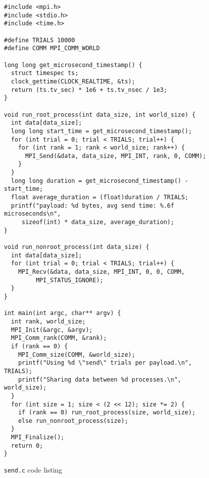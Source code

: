 \begin{figure}
\begin{Verbatim}[frame=single]
#include <mpi.h>
#include <stdio.h>
#include <time.h>

#define TRIALS 10000
#define COMM MPI_COMM_WORLD

long long get_microsecond_timestamp() {
  struct timespec ts;
  clock_gettime(CLOCK_REALTIME, &ts);
  return (ts.tv_sec) * 1e6 + ts.tv_nsec / 1e3;
}

void run_root_process(int data_size, int world_size) {
  int data[data_size];
  long long start_time = get_microsecond_timestamp();
  for (int trial = 0; trial < TRIALS; trial++) {
    for (int rank = 1; rank < world_size; rank++) {
      MPI_Send(&data, data_size, MPI_INT, rank, 0, COMM);
    }
  }
  long long duration = get_microsecond_timestamp() - start_time;
  float average_duration = (float)duration / TRIALS;
  printf("payload: %d bytes, avg send time: %.6f microseconds\n",
	 sizeof(int) * data_size, average_duration);
}

void run_nonroot_process(int data_size) {
  int data[data_size];
  for (int trial = 0; trial < TRIALS; trial++) {
    MPI_Recv(&data, data_size, MPI_INT, 0, 0, COMM,
	     MPI_STATUS_IGNORE);
  }
}

int main(int argc, char** argv) {
  int rank, world_size;
  MPI_Init(&argc, &argv);
  MPI_Comm_rank(COMM, &rank);
  if (rank == 0) {
    MPI_Comm_size(COMM, &world_size);
    printf("Using %d \"send\" trials per payload.\n", TRIALS);
    printf("Sharing data between %d processes.\n", world_size);
  }
  for (int size = 1; size < (2 << 12); size *= 2) {
    if (rank == 0) run_root_process(size, world_size);
    else run_nonroot_process(size);
  }
  MPI_Finalize();
  return 0;
}
\end{Verbatim}
    \caption{\texttt{send.c} code listing}
    \label{code:send}
\end{figure}